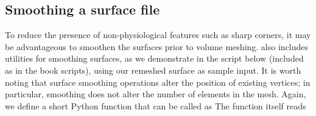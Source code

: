 \subsection{Smoothing a surface file}
\label{subsubsec:chp3:mesh-creation:smoothing}

To reduce the presence of non-physiological features such as sharp
corners, it may be advantageous to smoothen the surfaces prior to
volume meshing. \svmtk{} also includes utilities for smoothing surfaces, as
we demonstrate in the script below (included as
 in the book scripts), using
our remeshed surface  as sample input.  It is worth 
noting that surface smoothing operations alter the position of existing 
vertices; in particular, smoothing does not alter the number of elements in 
the mesh.  %
%
%
Again, we define a short Python function
 that can be called as
\noindent The function itself reads

